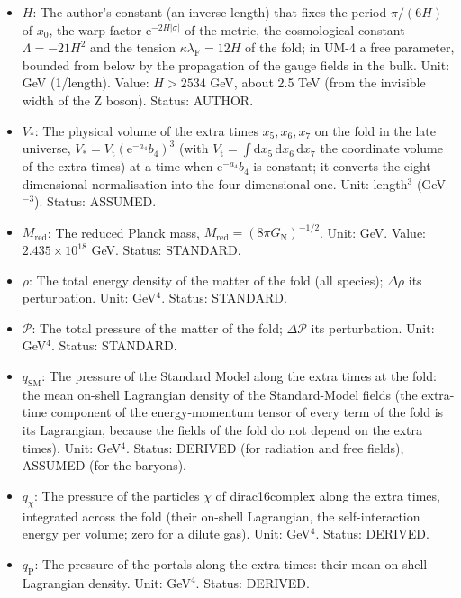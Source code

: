 \documentclass[
  10pt,
]{article}
\begin{document}
\begin{itemize}
  \(\lambda_{\mathrm{F}}V_* = 30H^2M_{\mathrm{red}}^2 = 1.1\times10^{45}\)
  GeV\(^4\) for \(H = 2534\) GeV. Status: DERIVED.
\item
  \(H\): The author's constant (an inverse length) that fixes the period
  \(\pi/(6H)\) of \(x_0\), the warp factor
  \(\mathrm{e}^{-2H\lvert\sigma\rvert}\) of the metric, the cosmological
  constant \(\Lambda = -21H^2\) and the tension
  \(\kappa\lambda_{\mathrm{F}} = 12H\) of the fold; in UM-4 a free
  parameter, bounded from below by the propagation of the gauge fields
  in the bulk. Unit: GeV (1/length). Value: \(H > 2534\) GeV, about 2.5
  TeV (from the invisible width of the Z boson). Status: AUTHOR.
\item
  \(V_*\): The physical volume of the extra times \(x_5, x_6, x_7\) on
  the fold in the late universe,
  \(V_* = V_{\mathrm{t}}(\mathrm{e}^{-a_4}b_4)^3\) (with
  \(V_{\mathrm{t}} = \int\mathrm{d}x_5\,\mathrm{d}x_6\,\mathrm{d}x_7\)
  the coordinate volume of the extra times) at a time when
  \(\mathrm{e}^{-a_4}b_4\) is constant; it converts the
  eight-dimensional normalisation into the four-dimensional one. Unit:
  length\(^3\) (GeV\(^{-3}\)). Status: ASSUMED.
\item
  \(M_{\mathrm{red}}\): The reduced Planck mass,
  \(M_{\mathrm{red}} = (8\pi G_{\mathrm{N}})^{-1/2}\). Unit: GeV. Value:
  \(2.435\times10^{18}\) GeV. Status: STANDARD.
\item
  \(\rho\): The total energy density of the matter of the fold (all
  species); \(\Delta\rho\) its perturbation. Unit: GeV\(^4\). Status:
  STANDARD.
\item
  \(\mathcal{P}\): The total pressure of the matter of the fold;
  \(\Delta\mathcal{P}\) its perturbation. Unit: GeV\(^4\). Status:
  STANDARD.
\item
  \(q_{\mathrm{SM}}\): The pressure of the Standard Model along the
  extra times at the fold: the mean on-shell Lagrangian density of the
  Standard-Model fields (the extra-time component of the energy-momentum
  tensor of every term of the fold is its Lagrangian, because the fields
  of the fold do not depend on the extra times). Unit: GeV\(^4\).
  Status: DERIVED (for radiation and free fields), ASSUMED (for the
  baryons).
\item
  \(q_\chi\): The pressure of the particles \(\chi\) of dirac16complex
  along the extra times, integrated across the fold (their on-shell
  Lagrangian, the self-interaction energy per volume; zero for a dilute
  gas). Unit: GeV\(^4\). Status: DERIVED.
\item
  \(q_{\mathrm{P}}\): The pressure of the portals along the extra times:
  their mean on-shell Lagrangian density. Unit: GeV\(^4\). Status:
  DERIVED.
\end{itemize}
\end{document}
